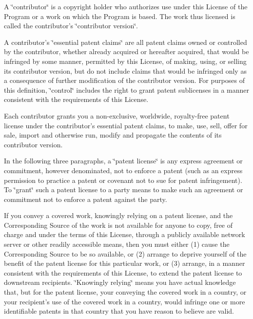 A \char`\"{}contributor\char`\"{} is a copyright holder who authorizes use under this License of the Program or a work on which the Program is based. The work thus licensed is called the contributor's \char`\"{}contributor version\char`\"{}.

A contributor's \char`\"{}essential patent claims\char`\"{} are all patent claims owned or controlled by the contributor, whether already acquired or hereafter acquired, that would be infringed by some manner, permitted by this License, of making, using, or selling its contributor version, but do not include claims that would be infringed only as a consequence of further modification of the contributor version. For purposes of this definition, \char`\"{}control\char`\"{} includes the right to grant patent sublicenses in a manner consistent with the requirements of this License.

Each contributor grants you a non-\/exclusive, worldwide, royalty-\/free patent license under the contributor's essential patent claims, to make, use, sell, offer for sale, import and otherwise run, modify and propagate the contents of its contributor version.

In the following three paragraphs, a \char`\"{}patent license\char`\"{} is any express agreement or commitment, however denominated, not to enforce a patent (such as an express permission to practice a patent or covenant not to sue for patent infringement). To \char`\"{}grant\char`\"{} such a patent license to a party means to make such an agreement or commitment not to enforce a patent against the party.

If you convey a covered work, knowingly relying on a patent license, and the Corresponding Source of the work is not available for anyone to copy, free of charge and under the terms of this License, through a publicly available network server or other readily accessible means, then you must either (1) cause the Corresponding Source to be so available, or (2) arrange to deprive yourself of the benefit of the patent license for this particular work, or (3) arrange, in a manner consistent with the requirements of this License, to extend the patent license to downstream recipients. \char`\"{}\+Knowingly relying\char`\"{} means you have actual knowledge that, but for the patent license, your conveying the covered work in a country, or your recipient's use of the covered work in a country, would infringe one or more identifiable patents in that country that you have reason to believe are valid.


